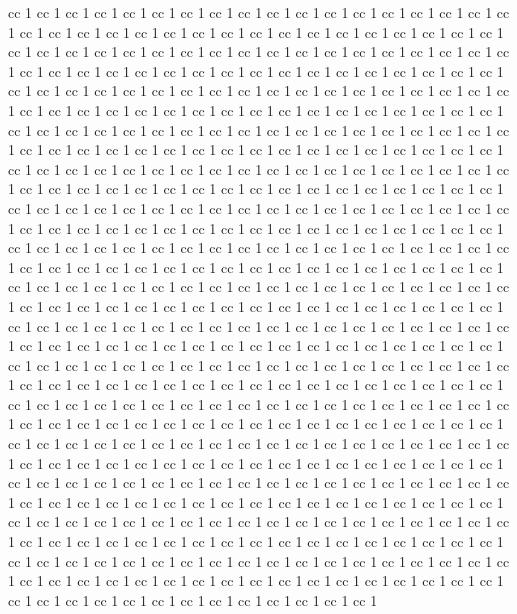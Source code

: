 \documentclass[11pt]{article}
\begin{document}
 cc 1  cc 1  cc 1  cc 1  cc 1  cc 1  cc 1  cc 1  cc 1  cc 1  cc 1  cc 1  cc 1  cc 1  cc 1  cc 1  cc 1  cc 1  cc 1  cc 1  cc 1  cc 1  cc 1  cc 1  cc 1  cc 1  cc 1  cc 1  cc 1  cc 1  cc 1  cc 1  cc 1  cc 1  cc 1  cc 1  cc 1  cc 1  cc 1  cc 1  cc 1  cc 1  cc 1  cc 1  cc 1  cc 1  cc 1  cc 1  cc 1  cc 1  cc 1  cc 1  cc 1  cc 1  cc 1  cc 1  cc 1  cc 1  cc 1  cc 1  cc 1  cc 1  cc 1  cc 1  cc 1  cc 1  cc 1  cc 1  cc 1  cc 1  cc 1  cc 1  cc 1  cc 1  cc 1  cc 1  cc 1  cc 1  cc 1  cc 1  cc 1  cc 1  cc 1  cc 1  cc 1  cc 1  cc 1  cc 1  cc 1  cc 1  cc 1  cc 1  cc 1  cc 1  cc 1  cc 1  cc 1  cc 1  cc 1  cc 1  cc 1  cc 1  cc 1  cc 1  cc 1  cc 1  cc 1  cc 1  cc 1  cc 1  cc 1  cc 1  cc 1  cc 1  cc 1  cc 1  cc 1  cc 1  cc 1  cc 1  cc 1  cc 1  cc 1  cc 1  cc 1  cc 1  cc 1  cc 1  cc 1  cc 1  cc 1  cc 1  cc 1  cc 1  cc 1  cc 1  cc 1  cc 1  cc 1  cc 1  cc 1  cc 1  cc 1  cc 1  cc 1  cc 1  cc 1  cc 1  cc 1  cc 1  cc 1  cc 1  cc 1  cc 1  cc 1  cc 1  cc 1  cc 1  cc 1  cc 1  cc 1  cc 1  cc 1  cc 1  cc 1  cc 1  cc 1  cc 1  cc 1  cc 1  cc 1  cc 1  cc 1  cc 1  cc 1  cc 1  cc 1  cc 1  cc 1  cc 1  cc 1  cc 1  cc 1  cc 1  cc 1  cc 1  cc 1  cc 1  cc 1  cc 1  cc 1  cc 1  cc 1  cc 1  cc 1  cc 1  cc 1  cc 1  cc 1  cc 1  cc 1  cc 1  cc 1  cc 1  cc 1  cc 1  cc 1  cc 1  cc 1  cc 1  cc 1  cc 1  cc 1  cc 1  cc 1  cc 1  cc 1  cc 1  cc 1  cc 1  cc 1  cc 1  cc 1  cc 1  cc 1  cc 1  cc 1  cc 1  cc 1  cc 1  cc 1  cc 1  cc 1  cc 1  cc 1  cc 1  cc 1  cc 1  cc 1  cc 1  cc 1  cc 1  cc 1  cc 1  cc 1  cc 1  cc 1  cc 1  cc 1  cc 1  cc 1  cc 1  cc 1  cc 1  cc 1  cc 1  cc 1  cc 1  cc 1  cc 1  cc 1  cc 1  cc 1  cc 1  cc 1  cc 1  cc 1  cc 1  cc 1  cc 1  cc 1  cc 1  cc 1  cc 1  cc 1  cc 1  cc 1  cc 1  cc 1  cc 1  cc 1  cc 1  cc 1  cc 1  cc 1  cc 1  cc 1  cc 1  cc 1  cc 1  cc 1  cc 1  cc 1  cc 1  cc 1  cc 1  cc 1  cc 1  cc 1  cc 1  cc 1  cc 1  cc 1  cc 1  cc 1  cc 1  cc 1  cc 1  cc 1  cc 1  cc 1  cc 1  cc 1  cc 1  cc 1  cc 1  cc 1  cc 1  cc 1  cc 1  cc 1  cc 1  cc 1  cc 1  cc 1  cc 1  cc 1  cc 1  cc 1  cc 1  cc 1  cc 1  cc 1  cc 1  cc 1  cc 1  cc 1  cc 1  cc 1  cc 1  cc 1  cc 1  cc 1  cc 1  cc 1  cc 1  cc 1  cc 1  cc 1  cc 1  cc 1  cc 1  cc 1  cc 1  cc 1  cc 1  cc 1  cc 1  cc 1  cc 1  cc 1  cc 1  cc 1  cc 1  cc 1  cc 1  cc 1  cc 1  cc 1  cc 1  cc 1  cc 1  cc 1  cc 1  cc 1  cc 1  cc 1  cc 1  cc 1  cc 1  cc 1  cc 1  cc 1  cc 1  cc 1  cc 1  cc 1  cc 1  cc 1  cc 1  cc 1  cc 1  cc 1  cc 1  cc 1  cc 1  cc 1  cc 1  cc 1  cc 1  cc 1  cc 1  cc 1  cc 1  cc 1  cc 1  cc 1  cc 1  cc 1  cc 1  cc 1  cc 1  cc 1  cc 1  cc 1  cc 1  cc 1  cc 1  cc 1  cc 1  cc 1  cc 1  cc 1  cc 1  cc 1  cc 1  cc 1  cc 1  cc 1  cc 1  cc 1  cc 1  cc 1  cc 1  cc 1  cc 1  cc 1  cc 1  cc 1  cc 1  cc 1  cc 1  cc 1  cc 1  cc 1  cc 1  cc 1  cc 1  cc 1  cc 1  cc 1  cc 1  cc 1  cc 1  cc 1  cc 1  cc 1  cc 1  cc 1  cc 1  cc 1  cc 1  cc 1  cc 1  cc 1  cc 1  cc 1  cc 1  cc 1  cc 1  cc 1  cc 1  cc 1  cc 1  cc 1  cc 1  cc 1  cc 1  cc 1  cc 1  cc 1  cc 1  cc 1  cc 1  cc 1  cc 1  cc 1  cc 1  cc 1  cc 1  cc 1  cc 1  cc 1  cc 1  cc 1  cc 1  cc 1  cc 1  cc 1  cc 1  cc 1  cc 1  cc 1  cc 1  cc 1  cc 1  cc 1  cc 1  cc 1  cc 1  cc 1  cc 1  cc 1  cc 1  cc 1  cc 1  cc 1  cc 1  cc 1  cc 1  cc 1  cc 1  cc 1  cc 1  cc 1  cc 1  cc 1  cc 1  cc 1  cc 1  cc 1  cc 1  cc 1  cc 1  cc 1  cc 1  cc 1  cc 1
\end{document}
